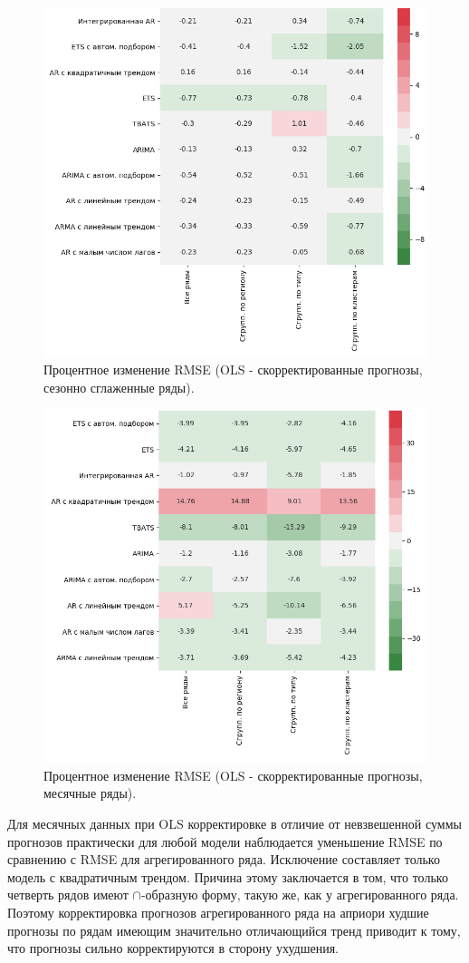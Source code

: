 \documentclass[12pt,a4paper, oneside]{extreport}
\begin{document}
\begin{figure}
	\centering
	\includegraphics[width=0.7\linewidth]{screenshot018}
	\caption{Процентное изменение RMSE (OLS - скорректированные прогнозы, сезонно сглаженные  ряды).
	}
	\label{fig223}
\end{figure}


\begin{figure}
	\centering
	\includegraphics[width=0.7\linewidth]{screenshot019}
	\caption{Процентное изменение RMSE (OLS - скорректированные прогнозы, месячные ряды).
	}
	\label{fig334}
\end{figure}




Для месячных данных при OLS корректировке в отличие от     невзвешенной суммы прогнозов  практически для любой модели наблюдается уменьшение RMSE по сравнению с  RMSE для  агрегированного ряда. Исключение составляет только модель с квадратичным трендом. Причина этому заключается в том, что только четверть рядов имеют $\cap$-образную форму, такую же, как у  агрегированного  ряда.  Поэтому корректировка прогнозов агрегированного ряда на априори худшие  прогнозы по рядам  имеющим  значительно  отличающийся тренд  приводит к тому, что прогнозы сильно корректируются в сторону ухудшения. 
\end{document}
